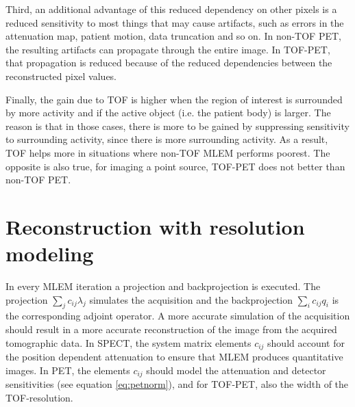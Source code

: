 \documentclass[11pt,oneside]{book}
\begin{document}
Third, an additional advantage of this reduced dependency on other
pixels is a reduced sensitivity to most things that may cause
artifacts, such as errors in the attenuation map, patient motion, data
truncation and so on. In non-TOF PET, the resulting artifacts can
propagate through the entire image. In TOF-PET, that propagation is
reduced because of the reduced dependencies between the reconstructed
pixel values.

Finally, the gain due to TOF is higher when the region of interest is
surrounded by more activity and if the active object (i.e. the patient
body) is larger. The reason is that in those cases, there is more to
be gained by suppressing sensitivity to surrounding activity, since
there is more surrounding activity. As a result, TOF helps more in
situations where non-TOF MLEM performs poorest. The opposite is also
true, for imaging a point source, TOF-PET does not better than non-TOF
PET.

\section{Reconstruction with resolution modeling} \label{sec:resol}
In every MLEM iteration a projection and backprojection is
executed. The projection $\sum_j c_{ij} \lambda_j$ simulates the
acquisition and the backprojection $\sum_i c_{ij} q_i$ is the
corresponding adjoint operator. A more accurate simulation of the
acquisition should result in a more accurate reconstruction of the
image from the acquired tomographic data. In SPECT, the system matrix
elements $c_{ij}$ should account for the position dependent
attenuation to ensure that MLEM produces quantitative images. In PET,
the elements $c_{ij}$ should model the attenuation and detector
sensitivities (see equation \ref{eq:petnorm}), and for TOF-PET, also
the width of the TOF-resolution.
\end{document}
